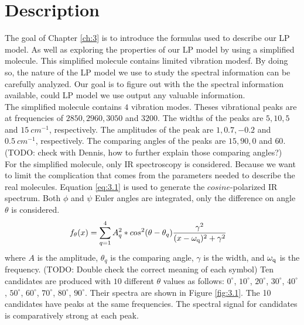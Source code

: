 \label{ch:3}

\section{Description}
The goal of Chapter \ref{ch:3} is to introduce the formulas used to describe our LP model. As well as exploring the properties of our LP model by using a simplified molecule. This simplified molecule contains limited vibration modesf. By doing so, the nature of the LP model we use to study the spectral information can be carefully analyzed. Our goal is to figure out with the the spectral information available, could LP model we use output any valuable information. \\

The simplified molecule contains $4$ vibration modes. Theses vibrational peaks are at frequencies of $2850, 2960, 3050$ and $3200$. The widths of the peaks are $5, 10, 5$ and $15~cm^{-1}$, respectively. The amplitudes of the peak are $1, 0.7, -0.2$ and $0.5~cm^{-1}$, respectively. The comparing angles of the peaks are $15, 90, 0$ and $60$. (TODO: check with Dennis, how to further explain those comparing angles?)  \\

For the simplified molecule, only IR spectroscopy is considered. Because we want to limit the complication that comes from the parameters needed to describe the real molecules. Equation \ref{eq:3.1} is used to generate the $cosine$-polarized IR spectrum. Both $\phi$ and $\psi$ Euler angles are integrated, only the difference on angle $\theta$ is considered. \\

\begin{eqnarray} \label{eq:3.1}
& f_{\theta}(x) = \displaystyle\sum^{4}_{q=1} A_q^2 * cos^2(\theta - \theta_q)\frac{\gamma^2}{(x- \omega_{\rm q})^2 + \gamma^2} 
\end{eqnarray}
where $A$ is the amplitude, $\theta_{q}$ is the comparing angle, $\gamma$ is the width, and $\omega_{\rm q}$ is the frequency. (TODO: Double check the correct meaning of each symbol) Ten candidates are produced with $10$ different $\theta$ values as follows: $0^{\circ}$, $10^{\circ}$, $20^{\circ}$, $30^{\circ}$, $40^{\circ}$, $50^{\circ}$, $60^{\circ}$, $70^{\circ}$, $80^{\circ}$, $90^{\circ}$. Their spectra are shown in Figure \ref{fig:3.1}. The 10 candidates have peaks at the same frequencies. The spectral signal for candidates is comparatively strong at each peak. \\

